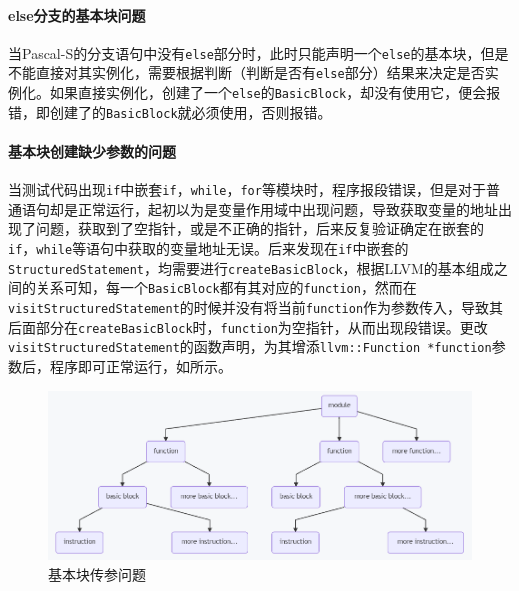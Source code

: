 \documentclass[lang=cn,11pt,a4paper,cite=authornum]{paper}
\begin{document}
\paragraph{else分支的基本块问题}

当Pascal-S的分支语句中没有\texttt{else}部分时，此时只能声明一个\texttt{else}的基本块，但是不能直接对其实例化，需要根据判断（判断是否有\texttt{else}部分）结果来决定是否实例化。如果直接实例化，创建了一个\texttt{else}的\texttt{BasicBlock}，却没有使用它，便会报错，即创建了的\texttt{BasicBlock}就必须使用，否则报错。

\paragraph{基本块创建缺少参数的问题}

当测试代码出现\texttt{if}中嵌套\texttt{if}，\texttt{while}，\texttt{for}等模块时，程序报段错误，但是对于普通语句却是正常运行，起初以为是变量作用域中出现问题，导致获取变量的地址出现了问题，获取到了空指针，或是不正确的指针，后来反复验证确定在嵌套的\texttt{if}，\texttt{while}等语句中获取的变量地址无误。后来发现在\texttt{if}中嵌套的\texttt{StructuredStatement}，均需要进行\texttt{createBasicBlock}，根据LLVM的基本组成之间的关系可知，每一个\texttt{BasicBlock}都有其对应的\texttt{function}，然而在\texttt{visitStructuredStatement}的时候并没有将当前\texttt{function}作为参数传入，导致其后面部分在\texttt{createBasicBlock}时，\texttt{function}为空指针，从而出现段错误。更改\texttt{visitStructuredStatement}的函数声明，为其增添\texttt{llvm::Function *function}参数后，程序即可正常运行，如所示。

\begin{figure}[htbp]
    \centering
    \includegraphics[width=\linewidth]{./Images/BBfunc.png}
    \caption{基本块传参问题\label{fig:BBfunc}}
\end{figure}
\end{document}
